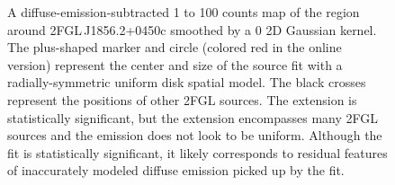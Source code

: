 \documentclass[12pt,preprint]{aastex}
\newif\ifcolorfigure
\newcommand{\gev}{\text{GeV}\xspace}
\begin{document}
\clearpage
\begin{figure}
    \ifcolorfigure
    \plotone{source_plots/example_bad_fit_color.eps}
    \else
    \fi
    \caption{
    A diffuse-emission-subtracted 1 \gev to 100 \gev counts map of the
    region around 2FGL\,J1856.2+0450c smoothed by a 0 2D Gaussian
    kernel. The plus-shaped marker and circle (colored red in
    the online version) represent the center and size of the source
    fit with a
    radially-symmetric uniform disk spatial model.  The black
    crosses represent the positions of other 2FGL sources.  The extension
    is statistically significant, but the extension encompasses many 2FGL
    sources and the emission does not look to be uniform. Although
    the fit is statistically significant, it likely corresponds to
    residual features of inaccurately modeled diffuse emission picked
    up by the fit. 
    }
    \label{example_bad_fit}
\end{figure}
\end{document}
